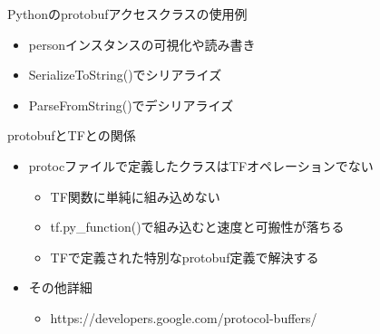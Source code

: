 \documentclass[aspectratio=169, dvipdfmx, 14pt, xcolor={svgnames,dvipsnames}, t]{beamer}
\begin{document}
\begin{frame}{Pythonのprotobufアクセスクラスの使用例}

  \begin{itemize}
    \tightlist
    \item
          personインスタンスの可視化や読み書き
    \item
          SerializeToString()でシリアライズ
    \item
          ParseFromString()でデシリアライズ
  \end{itemize}

\end{frame}


\begin{frame}{protobufとTFとの関係}

  \begin{itemize}
    \tightlist
    \item
          \alert{protocファイルで定義したクラスはTFオペレーションでない}

          \begin{itemize}
            \tightlist
            \item
                  TF関数に単純に組み込めない
            \item
                  tf.py\_function()で組み込むと速度と可搬性が落ちる
            \item
                  TFで定義された特別なprotobuf定義で解決する
          \end{itemize}
    \item
          その他詳細

          \begin{itemize}
            \tightlist
            \item
                  https://developers.google.com/protocol-buffers/
          \end{itemize}
  \end{itemize}

\end{frame}

\end{document}
